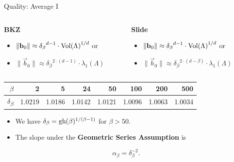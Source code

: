 \documentclass[xcolor=table,10pt,aspectratio=169]{beamer}
\begin{document}
\begin{frame}[label={sec:orgef2e89c}]{Quality: Average I}
\begin{columns}[t]
\begin{column}{0.50\columnwidth}
\textbf{BKZ}

\begin{itemize}
\item \(\|\mathbf{b}_{0}\| \approx {\delta_{\beta}}^{{d-1}} \cdot {\operatorname{Vol}(\Lambda)}^{1/d}\) or
\item \(\|\vec b_{0}\| \approx {\delta_{\beta}}^{2\cdot{(d-1)}} \cdot \lambda_{1}(\Lambda)\)
\end{itemize}
\end{column}

\begin{column}{0.50\columnwidth}
\textbf{Slide}

\begin{itemize}
\item \(\|\mathbf{b}_{0}\| \approx {\delta_{\beta}}^{{d-1}} \cdot {\operatorname{Vol}(\Lambda)}^{1/d}\) or

\item \(\|\vec b_{0}\| \approx {\delta_{\beta}}^{2\cdot{(d-\beta)}} \cdot \lambda_{1}(\Lambda)\)
\end{itemize}
\end{column}
\end{columns}

\begin{center}
\begin{tabular}{rrrrrrrr}
\(\beta\) & 2 & 5 & 24 & 50 & 100 & 200 & 500\\
\hline
\(\delta\)\textsubscript{\(\beta\)} & 1.0219 & 1.0186 & 1.0142 & 1.0121 & 1.0096 & 1.0063 & 1.0034\\
\end{tabular}

\end{center}

\begin{itemize}
\item We have \(\delta_{\beta} = \textnormal{gh}(\beta)^{1/(\beta-1)}\) for \(\beta > 50\).
\item The slope under the \textbf{Geometric Series Assumption} is
\end{itemize}
\[\alpha_{\beta} = \delta_{\beta}^{-2}.\]
\end{frame}
\end{document}
